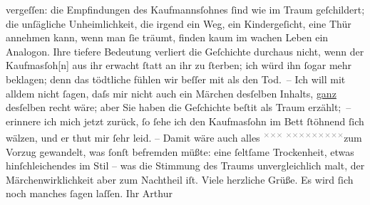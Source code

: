 \begin{ledgroupsized}[t]{13cm}
               vergeſſen: die Empfindungen des Kaufmannsſohnes ſind wie im Traum geſchildert; die
               unſägliche Unheimlichkeit, die irgend ein Weg, ein Kindergeſicht, eine Thür annehmen
               kann, wenn man ſie träumt, finden kaum im wachen Leben ein Analogon. Ihre tiefere
               Bedeutung verliert die Geſchichte durchaus nicht, wenn der Kaufma{\geminationn}sſoh{[}n{]} aus ihr erwacht ſtatt an ihr zu ſterben; ich
               würd ihn ſogar mehr beklagen; denn das tödtliche fühlen wir beſſer mit als den Tod. –
               Ich will mit alldem {\pb}nicht ſagen, daſs mir \introOben{}nicht\introOben{} auch ein Märchen desſelben Inhalts, \uline{ganz} desſelben recht wäre; aber Sie
               haben die Geſchichte beſti{\geminationm}t als Traum erzählt; – erinnere ich mich jetzt zurück,
               ſo ſehe ich den Kaufma{\geminationn}sſohn im Bett ſtöhnend ſich wälzen, und er thut mir ſehr leid.
               –\pend
           \pstart
           Damit wäre auch alles \substVorne{}\textsuperscript{\textcolor{gray}{×}\-\textcolor{gray}{×}\-\textcolor{gray}{×}{ }\textcolor{gray}{×}\-\textcolor{gray}{×}\-\textcolor{gray}{×}\-\textcolor{gray}{×}\-\textcolor{gray}{×}\-\textcolor{gray}{×}\-\textcolor{gray}{×}\-\textcolor{gray}{×}\-\textcolor{gray}{×}}\substDazwischen{}zum Vorzug gewandelt\substHinten{}, was ſonſt befremden müßte: eine ſeltſame Trockenheit, etwas
               hinſchleichendes im Stil – was die Stimmung des Traums unvergleichlich malt, der
               Märchenwirklichkeit aber zum Nachtheil iſt.\pend
           \pstart
           Viele herzliche Grüße. Es wird ſich noch manches ſagen laſſen.\pend
           \pstart Ihr \spacefill\mbox{Arthur}\pend{}
         
         \endnumbering{}\end{ledgroupsized}  \newcommand{\dateiname}{L00518}\newcommand{\titel}{Arthur Schnitzler an Hugo von Hofmannsthal, 26. 11. 1895}\newcommand{\editorInnen}{Martin Anton Müller und Gerd-Hermann Susen}
      